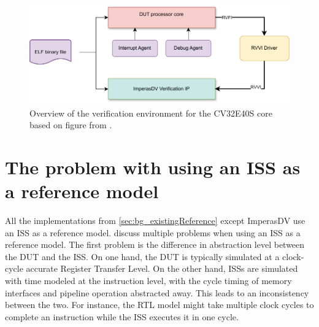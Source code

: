 \begin{figure}
    \centering
    \includegraphics[width=0.75\linewidth]{figures/core-v-verif.pdf}
    \caption{Overview of the verification environment for the CV32E40S core based on figure from \cite{openhwgroupOpenhwgroupCorevverif2023}.}
    \label{fig:cv32e40s-overview}
\end{figure}



%
%    



\section{The problem with using an ISS as a reference model}
\label{sec:back_issProblem}



All the implementations from \cref{sec:bg_existingReference} except ImperasDV use an ISS as a reference model. \textcite{taylorAdvancedRISCVVerification2023}  discuss multiple problems when using an ISS as a reference model. The first problem is the difference in abstraction level between the DUT and the ISS. On one hand, the DUT is typically simulated at a clock-cycle accurate Register Transfer Level. On the other hand, ISSs are simulated with time modeled at the instruction level, with the cycle timing of memory interfaces and pipeline operation abstracted away. This leads to an inconsistency between the two. For instance, the RTL model might take multiple clock cycles to complete an instruction while the ISS executes it in one cycle.

